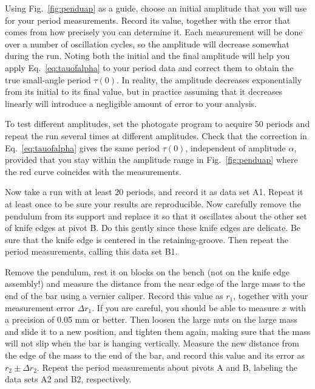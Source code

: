 \documentclass{revtex4}
\begin{document}
Using Fig.~\ref{fig:penduap} as a guide, choose an initial amplitude that
you will use for your period measurements.  Record its value, together
with the error that comes from how precisely you can determine it.  Each
measurement will be done over a number of oscillation cycles, so the
amplitude will decrease somewhat during the run.  Noting both
the initial and the final amplitude will help you apply
Eq.~\ref{eq:tauofalpha} to your period data and correct them to obtain
the true small-angle period $\tau(0)$.  In reality, the amplitude decreases
exponentially from its initial to its final value, but in practice assuming
that it decreases linearly will introduce a negligible amount of error to
your analysis.

To test different amplitudes, set the photogate program to acquire 50
periods and repeat the run several times at different amplitudes. 
Check that the correction in Eq.~\ref{eq:tauofalpha} gives the same
period $\tau(0)$, independent of amplitude $\alpha$, provided that you
stay within the amplitude range in Fig.~\ref{fig:penduap} where the
red curve coincides with the measurements.

Now take a run with at least 20 periods, and record it as data set A1.
Repeat it at least once to be sure your results are reproducible.  Now
carefully remove the pendulum from its support and replace it so that
it oscillates about the other set of knife edges at pivot B. Do this
gently since these knife edges are delicate. Be sure that the knife edge
is centered in the retaining-groove. Then repeat the period measurements,
calling this data set B1.

Remove the pendulum, rest it on blocks on the bench (not on the
knife edge assembly!) and measure the distance from the near edge of the
large mass to the end of the bar using a vernier caliper.  Record this
value as $r_1$, together with your measurement error $\Delta r_1$.
If you are careful, you should be able to measure $x$ with a precision
of 0.05 mm or better.  Then loosen the large nuts on the large mass and
slide it to a new position, and tighten them again, making sure that the
mass will not slip when the bar is hanging vertically.  Measure the new
distance from the edge of the mass to the end of the bar, and record this
value and its error as $r_2 \pm \Delta r_2$.  Repeat the period
measurements about pivots A and B, labeling the data sets A2 and B2,
respectively.
\end{document}
